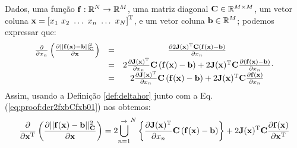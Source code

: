 \begin{myproofT}\label{proof:theo:der2fxbCfxb0}
Dados,
uma função $\VECTOR{f}:\mathbb{R}^{N} \rightarrow \mathbb{R}^{M}$, 
uma matriz diagonal $\MATRIX{C}\in \mathbb{R}^{M\times M}$, 
um vetor coluna $\VECTOR{x}=\left[x_{1}~ x_{2}~ \hdots~ x_{n}~ \hdots~ x_{N}\right]^{\transpose}$, e
um vetor coluna $\VECTOR{b}\in \mathbb{R}^{M}$;
podemos expressar que:
\begin{equation}\label{eq:proof:der2fxbCfxb01}
\begin{matrix}
\frac{\partial }{\partial x_{n}}\left( \frac{\partial ||\VECTOR{f}(\VECTOR{x})-\VECTOR{b}||_{\MATRIX{C}}^2}{\partial \VECTOR{x}} \right) & = &
\frac{\partial 2 \MATRIX{J}(\VECTOR{x})^{\transpose} \MATRIX{C} \left( \VECTOR{f}(\VECTOR{x})-\VECTOR{b}\right)}{\partial x_{n}} \\
~ & = & 2 \frac{\partial \MATRIX{J}(\VECTOR{x})^{\transpose} }{\partial x_{n}} \MATRIX{C} \left( \VECTOR{f}(\VECTOR{x})-\VECTOR{b}\right)+
2  \MATRIX{J}(\VECTOR{x})^{\transpose}  \MATRIX{C} \frac{\partial \left( \VECTOR{f}(\VECTOR{x})-\VECTOR{b}\right) }{\partial x_{n}}\\
~ & = & 2 \frac{\partial \MATRIX{J}(\VECTOR{x})^{\transpose} }{\partial x_{n}} \MATRIX{C} \left( \VECTOR{f}(\VECTOR{x})-\VECTOR{b}\right)+
2  \MATRIX{J}(\VECTOR{x})^{\transpose}  \MATRIX{C} \frac{\partial \VECTOR{f}(\VECTOR{x}) }{\partial x_{n}}\\
\end{matrix}.
\end{equation}
Assim, usando a Definição \ref{def:deltahor} junto com a Eq. (\ref{eq:proof:der2fxbCfxb01})
nos obtemos:
\begin{equation}\label{eq:proof:der2fxbCfxb02}
\frac{\partial }{\partial \VECTOR{x}^{\transpose}}\left( \frac{\partial ||\VECTOR{f}(\VECTOR{x})-\VECTOR{b}||_{\MATRIX{C}}^2}{\partial \VECTOR{x}} \right) =
2 {\bigcup\limits_{n=1}^{ \rightarrow }}^{N}\left\{ \frac{\partial \MATRIX{J}(\VECTOR{x})^{\transpose} }{\partial x_{n}} \MATRIX{C} \left( \VECTOR{f}(\VECTOR{x})-\VECTOR{b}\right) \right\} +
2  \MATRIX{J}(\VECTOR{x})^{\transpose}  \MATRIX{C} \frac{\partial \VECTOR{f}(\VECTOR{x}) }{\partial \VECTOR{x}^{\transpose}}
\end{equation}
\end{myproofT}

